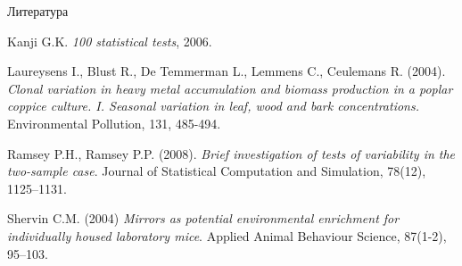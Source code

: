 \documentclass[9pt,pdf,utf8,hyperref={unicode},aspectratio=169]{beamer}
\begin{document}
\begin{frame}{Литература}
{		\vspace{5pt}		    
	
	Kanji G.K. \textit{100 statistical tests}, 2006.
		
		\vspace{5pt}
		    	
	Laureysens I., Blust R., De Temmerman L., Lemmens C., Ceulemans R. (2004). \textit{Clonal variation in heavy metal accumulation and biomass production in a poplar coppice culture. I. Seasonal variation in leaf, wood and bark concentrations.} Environmental Pollution, 131, 485-494.	
		
		\vspace{5pt}
		    	
	Ramsey P.H., Ramsey P.P. (2008). \textit{Brief investigation of tests of variability in the two-sample case}. Journal of Statistical Computation and Simulation, 78(12), 1125--1131.	
		
		\vspace{5pt}
		    	
	Shervin C.M. (2004) \textit{Mirrors as potential environmental enrichment for individually housed laboratory mice}. Applied Animal Behaviour Science, 87(1-2), 95--103.
	}
\end{frame}
\end{document}
